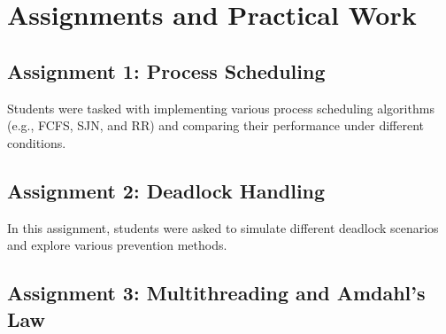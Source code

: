 \documentclass[12pt]{article}
\begin{document}
	\section{Assignments and Practical Work}
	\subsection{Assignment 1: Process Scheduling}
	Students were tasked with implementing various process scheduling algorithms (e.g., FCFS, SJN, and RR) and comparing their performance under different conditions.
	
	\subsection{Assignment 2: Deadlock Handling}
	In this assignment, students were asked to simulate different deadlock scenarios and explore various prevention methods.
	
	\subsection{Assignment 3: Multithreading and Amdahl's Law}
\end{document}
